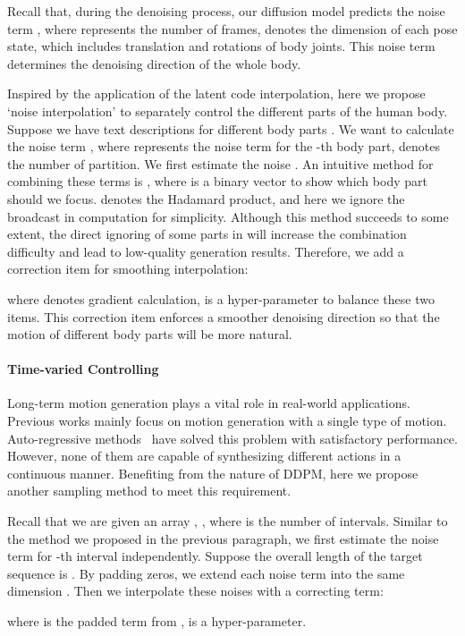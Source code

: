 Recall that, during the denoising process, our diffusion model predicts the noise term , where  represents the number of frames,  denotes the dimension of each pose state, which includes translation and rotations of body joints. This noise term determines the denoising direction of the whole body. 

Inspired by the application of the latent code interpolation, here we propose `noise interpolation' to separately control the different parts of the human body. Suppose we have  text descriptions  for different body parts . We want to calculate the noise term , where  represents the noise term for the -th body part,  denotes the number of partition. We first estimate the noise . An intuitive method for combining these terms is , where  is a binary vector to show which body part should we focus.  denotes the Hadamard product, and here we ignore the broadcast in computation for simplicity. Although this method succeeds to some extent, the direct ignoring of some parts in  will increase the combination difficulty and lead to low-quality generation results. Therefore, we add a correction item for smoothing interpolation:

where  denotes gradient calculation,  is a hyper-parameter to balance these two items. This correction item enforces a smoother denoising direction so that the motion of different body parts will be more natural.

\paragraph{Time-varied Controlling} Long-term motion generation plays a vital role in real-world applications. Previous works mainly focus on motion generation with a single type of motion. Auto-regressive methods~\citep{henter2020moglow,guo2022generating} have solved this problem with satisfactory performance. However, none of them are capable of synthesizing different actions in a continuous manner. Benefiting from the nature of DDPM, here we propose another sampling method to meet this requirement.

Recall that we are given an array , , where  is the number of intervals. Similar to the method we proposed in the previous paragraph, we first estimate the noise term  for -th interval independently. Suppose the overall length of the target sequence is . By padding zeros, we extend each noise term into the same dimension . Then we interpolate these noises with a correcting term:

where  is the padded term from ,  is a hyper-parameter.

